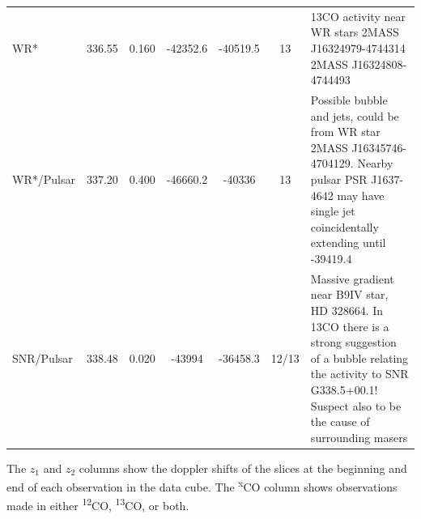 \documentclass[a4paper, titlepage, oneside]{article}
\newcommand{\elem}[2]{\textsuperscript{#1}{#2}}
\begin{document}
\begin{table}[H]
\begin{tabular*}{\textwidth}{@{\extracolsep{\fill} } l *{5}{c} p{5cm}}
WR*             & 336.55 &  0.160  & -42352.6 & -40519.5 & 13 &
                13CO activity near WR stars {2MASS J16324979-4744314} {2MASS J16324808-4744493} \\
WR*/Pulsar      & 337.20 &  0.400  & -46660.2 &  -40336  & 13 &
                Possible bubble and jets, could be from WR star {2MASS J16345746-4704129}. Nearby pulsar {PSR J1637-4642} may have single jet coincidentally extending until -39419.4 \\
SNR/Pulsar      & 338.48 &  0.020  &  -43994  & -36458.3 & 12/13 &
                Massive gradient near B9IV star, HD 328664. In 13CO there is a strong suggestion of a bubble relating the activity to SNR G338.5+00.1! Suspect also to be the cause of surrounding masers \\
\hline
\end{tabular*}
\label{tab:mopra-obs}
\end{table}
\vspace{-1em}
{\footnotesize The \(z_1\) and \(z_2\) columns show the doppler shifts of the slices at the beginning and end of each observation in the data cube. The \elem{x}{C}O column shows observations made in either \elem{12}{C}O, \elem{13}{C}O, or both.}
\end{document}
